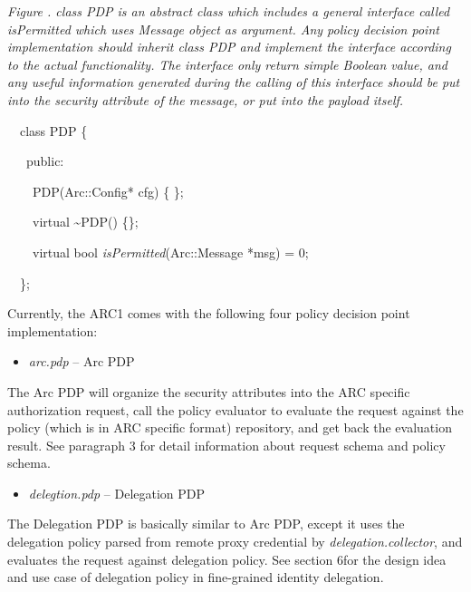 \documentclass{article}
\newcommand\liststyleWWviiiNumxiii{%
\renewcommand\labelitemi{[F0B7?]}
\renewcommand\labelitemii{[F0B7?]}
\renewcommand\labelitemiii{[F0B7?]}
\renewcommand\labelitemiv{[F0B7?]}
}
\newcounter{Figure}
\renewcommand\theFigure{\arabic{Figure}}
\begin{document}
{\centering{}\itshape\color{black}
Figure \stepcounter{Figure}{\theFigure}. class PDP is an abstract class
which includes a general interface called isPermitted which uses
Message object as argument. Any policy decision point implementation
should inherit class PDP and implement the interface according to the
actual functionality. The interface only return simple Boolean value,
and any useful information generated during the calling of this
interface should be put into the security attribute of the message, or
put into the payload itself.
\par}

\begin{center}
\begin{minipage}{3.8756in}
{\color{black}
\ \ class PDP \{}

{\upshape\color{black}
\ \ \ public:}

{\upshape\color{black}
\ \ \ \ PDP(Arc::Config* cfg) \{ \};}

{\upshape\color{black}
\ \ \ \ virtual \~{}PDP() \{\};}

{\upshape\color{black}
\ \ \ \ virtual bool \textit{isPermitted}(Arc::Message *msg) = 0;}

{\color{black}
\ \ \};}
\end{minipage}
\end{center}
{\upshape\color{black}
Currently, the ARC1 comes with the following four policy decision point
implementation: }

\liststyleWWviiiNumxiii
\begin{itemize}
\item {\color{black}
\textit{arc.pdp }{}-- Arc PDP}
\end{itemize}
{\upshape\color{black}
The Arc PDP will organize the security attributes into the ARC specific
authorization request, call the policy evaluator to evaluate the
request against the policy (which is in ARC specific format)
repository, and get back the evaluation result. See paragraph 3 for
detail information about request schema and policy schema.}

\liststyleWWviiiNumxiii
\begin{itemize}
\item {\color{black}
\textit{delegtion.pdp} -- Delegation PDP}
\end{itemize}
{\upshape\color{black}
The Delegation PDP is basically similar to Arc PDP, except it uses the
delegation policy parsed from remote proxy credential by
\textit{delegation.collector}, and evaluates the request against
delegation policy. See section 6for the design idea and use case of
delegation policy in fine-grained identity delegation.}
\end{document}
